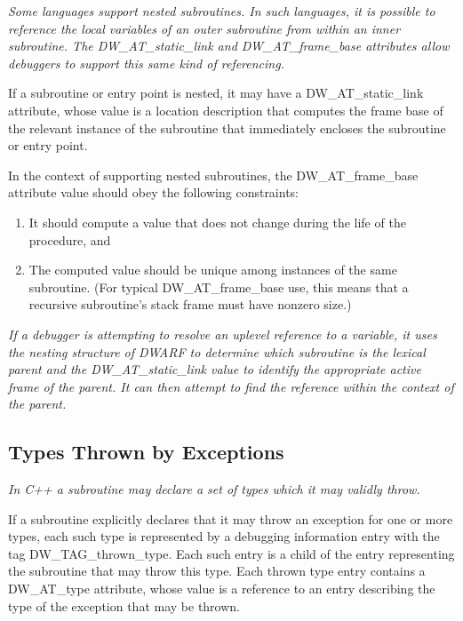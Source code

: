 \textit{Some languages support nested subroutines. In such languages,
it is possible to reference the local variables of an
outer subroutine from within an inner subroutine. The
DW\_AT\_static\_link and DW\_AT\_frame\_base attributes allow
debuggers to support this same kind of referencing.}

If a subroutine or entry point is nested, it may have a
DW\_AT\_static\_link attribute, whose value is a location
description that computes the frame base of the relevant
instance of the subroutine that immediately encloses the
subroutine or entry point.

In the context of supporting nested subroutines, the
DW\_AT\_frame\_base attribute value should obey the following
constraints:

\begin{enumerate}[1.]
\item It should compute a value that does not change during the
life of the procedure, and

\item The computed value should be unique among instances of
the same subroutine. (For typical DW\_AT\_frame\_base use, this
means that a recursive subroutine’s stack frame must have
non\dash zero size.)
\end{enumerate}

\textit{If a debugger is attempting to resolve an up\dash level reference
to a variable, it uses the nesting structure of DWARF to
determine which subroutine is the lexical parent and the
DW\_AT\_static\_link value to identify the appropriate active
frame of the parent. It can then attempt to find the reference
within the context of the parent.}



\subsection{Types Thrown by Exceptions}
\label{chap:typesthrownbyexceptions}

\textit{In C++ a subroutine may declare a set of types which
it may validly throw.}

If a subroutine explicitly declares that it may throw
an exception for one or more types, each such type is
represented by a debugging information entry with the tag
DW\-\_TAG\-\_thrown\-\_type.  Each such entry is a child of the entry
representing the subroutine that may throw this type. Each
thrown type entry contains a DW\-\_AT\-\_type attribute, whose
value is a reference to an entry describing the type of the
exception that may be thrown.

